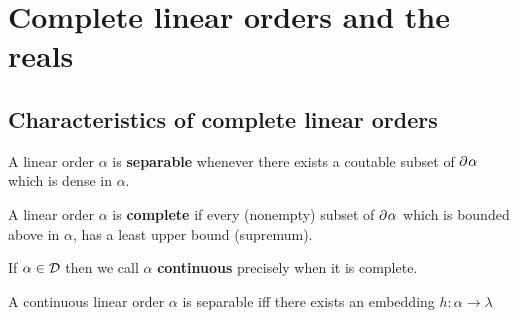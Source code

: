
\chapter{Complete linear orders and the reals}

\section{Characteristics of complete linear orders}

\begin{dfn}[Separable]
	A linear order $\alpha$ is \textbf{separable} whenever there exists a coutable subset of $\partial^{}{}\alpha$ which is dense in $\alpha$.
\end{dfn}

\begin{dfn}[Completeness]
	A linear order $\alpha$ is \textbf{complete} if every (nonempty) subset of $\partial^{}{\alpha}$ which is bounded above in $\alpha$, has a least upper bound (supremum).
\end{dfn}

\begin{dfn}
	If $\alpha\in\mathcal{D}$ then we call $\alpha$ \textbf{continuous} precisely when it is complete.
\end{dfn}

\begin{prp}[Separability]\label{prp:sep}
	A continuous linear order $\alpha$ is separable iff there exists an embedding $h\colon\alpha\to\lambda$
\end{prp}

